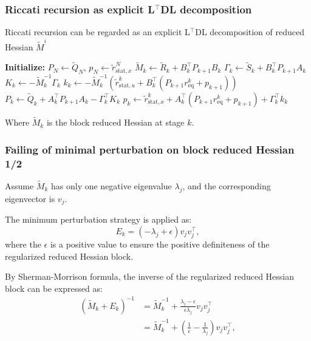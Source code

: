 \documentclass[10pt,aspectratio=1610]{beamer} %
\begin{document}
\begin{frame}
    \frametitle{Riccati recursion as explicit L$^\top$DL decomposition}
    Riccati recursion can be regarded as an explicit L$^\top$DL decomposition of reduced Hessian $\tilde{M}^i$\\
    \begin{algorithm}[H]
    \caption{Backward Pass of Riccati Recursion}
    \label{alg:riccati_recursion}
    \begin{algorithmic}[1]
    \State\textbf{Initialize:} $P_N \gets \tilde{Q}_N$, $p_N \gets \tilde{r}_{\mathrm{stat}, x}^N$
    \Statex 
        \State $\tilde{M}_k \gets \tilde{R}_k + B_k^\top P_{k+1} B_k$
        \State $\Gamma_k \gets \tilde{S}_k + B_k^\top P_{k+1} A_k$
        \State $K_k \gets -\tilde{M}_k^{-1} \Gamma_k$
        \State $k_k \gets -\tilde{M}_k^{-1} \left(\tilde{r}_{\mathrm{stat}, u}^k + B_k^\top (P_{k+1} r_{\mathrm{eq}}^k + p_{k+1})\right)$
        \State $P_k \gets \tilde{Q}_k + A_k^\top P_{k+1} A_k - \Gamma_k^\top K_k$
        \State $p_k \gets \tilde{r}_{\mathrm{stat}, x}^k + A_k^\top (P_{k+1} r_{\mathrm{eq}}^k + p_{k+1}) + \Gamma_k^\top k_k$
    \EndFor
    \end{algorithmic}
    \end{algorithm}
    Where $\tilde{M}_k$ is the block reduced Hessian at stage $k$.
\end{frame}

\begin{frame}
    \frametitle{Failing of minimal perturbation on block reduced Hessian 1/2}
    Assume $\tilde{M}_k$ has only one negative eigenvalue $\lambda_j$, and the corresponding eigenvector is $v_j$.

    The minimum perturbation strategy is applied as:
    \begin{equation}
        E_k = (-\lambda_{j}+\epsilon) v_j v_j^\top,
    \end{equation}
    where the $\epsilon$ is a positive value to ensure the positive definiteness of the regularized reduced Hessian block. 

    \vspace{0.5cm}

    By Sherman-Morrison formula, the inverse of the regularized reduced Hessian block can be expressed as:
    \begin{align*}
        (\tilde{M}_k + E_k)^{-1} &= \tilde{M}_k^{-1} + \frac{\lambda_j-\epsilon}{\epsilon \lambda_j} v_j v_j^\top \\
                                &= \tilde{M}_k^{-1} + (\frac{1}{\epsilon} - \frac{1}{\lambda_j}) v_j v_j^\top,
    \end{align*}

\end{frame}
\end{document}
